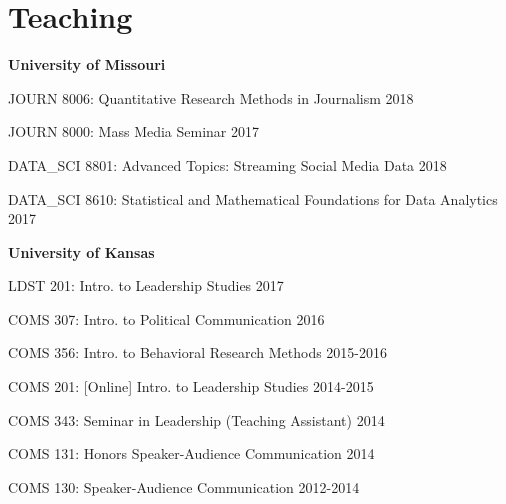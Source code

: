 
\section{Teaching}

  \textbf{University of Missouri}
    \begin{innerlist}
      \item JOURN 8006: Quantitative Research Methods in Journalism \hfill 2018
      \item JOURN 8000: Mass Media Seminar \hfill 2017
      \item DATA\_SCI 8801: Advanced Topics: Streaming Social Media Data \hfill 2018
      \item DATA\_SCI 8610: Statistical and Mathematical Foundations for Data Analytics \hfill 2017
    \end{innerlist}\vspace{1em}

  \textbf{University of Kansas}
    \begin{innerlist}
      \item LDST 201: Intro. to Leadership Studies \hfill 2017
      \item COMS 307: Intro. to Political Communication \hfill 2016
      \item COMS 356: Intro. to Behavioral Research Methods \hfill 2015-2016
      \item COMS 201: {[}Online{]} Intro. to Leadership Studies \hfill 2014-2015
      \item COMS 343: Seminar in Leadership (Teaching Assistant) \hfill 2014
      \item COMS 131: Honors Speaker-Audience Communication \hfill 2014
      \item COMS 130: Speaker-Audience Communication \hfill 2012-2014
    \end{innerlist}\vspace{-.1in}
